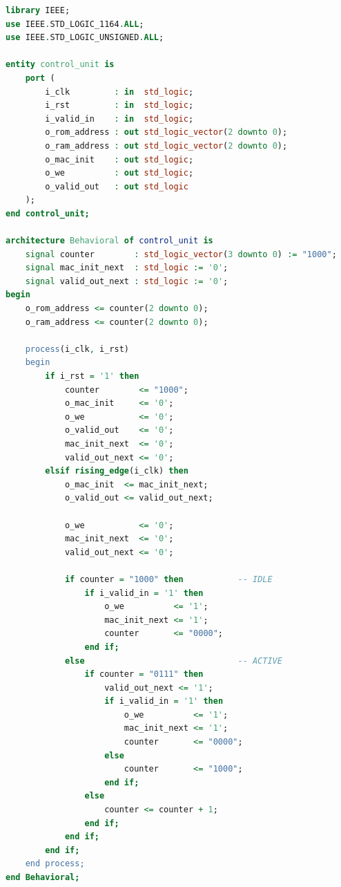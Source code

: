 \documentclass[12pt]{article}
\begin{document}
\begin{lstlisting}[language=VHDL]
library IEEE;
use IEEE.STD_LOGIC_1164.ALL;
use IEEE.STD_LOGIC_UNSIGNED.ALL;

entity control_unit is
    port (
        i_clk         : in  std_logic;
        i_rst         : in  std_logic;
        i_valid_in    : in  std_logic;
        o_rom_address : out std_logic_vector(2 downto 0);
        o_ram_address : out std_logic_vector(2 downto 0);
        o_mac_init    : out std_logic;
        o_we          : out std_logic;
        o_valid_out   : out std_logic
    );
end control_unit;

architecture Behavioral of control_unit is
    signal counter        : std_logic_vector(3 downto 0) := "1000";
    signal mac_init_next  : std_logic := '0';
    signal valid_out_next : std_logic := '0';
begin
    o_rom_address <= counter(2 downto 0);
    o_ram_address <= counter(2 downto 0);

    process(i_clk, i_rst)
    begin
        if i_rst = '1' then
            counter        <= "1000";
            o_mac_init     <= '0';
            o_we           <= '0';
            o_valid_out    <= '0';
            mac_init_next  <= '0';
            valid_out_next <= '0';
        elsif rising_edge(i_clk) then
            o_mac_init  <= mac_init_next;
            o_valid_out <= valid_out_next;

            o_we           <= '0';
            mac_init_next  <= '0';
            valid_out_next <= '0';

            if counter = "1000" then           -- IDLE
                if i_valid_in = '1' then
                    o_we          <= '1';
                    mac_init_next <= '1';
                    counter       <= "0000";
                end if;
            else                               -- ACTIVE
                if counter = "0111" then
                    valid_out_next <= '1';
                    if i_valid_in = '1' then
                        o_we          <= '1';
                        mac_init_next <= '1';
                        counter       <= "0000";
                    else
                        counter       <= "1000";
                    end if;
                else
                    counter <= counter + 1;
                end if;
            end if;
        end if;
    end process;
end Behavioral;
\end{lstlisting}

\newpage
\end{document}
